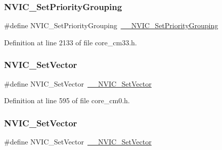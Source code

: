 \subsubsection{\texorpdfstring{N\+V\+I\+C\+\_\+\+Set\+Priority\+Grouping}{NVIC\_SetPriorityGrouping}\hspace{0.1cm}{\footnotesize\ttfamily [11/11]}}
{\footnotesize\ttfamily \#define N\+V\+I\+C\+\_\+\+Set\+Priority\+Grouping~\hyperlink{group___c_m_s_i_s___core___n_v_i_c_functions_gafc94dcbaee03e4746ade1f5bb9aaa56d}{\+\_\+\+\_\+\+N\+V\+I\+C\+\_\+\+Set\+Priority\+Grouping}}



Definition at line 2133 of file core\+\_\+cm33.\+h.

\mbox{\label{group___c_m_s_i_s___core___n_v_i_c_functions_ga804af63bb4c4c317387897431814775d}} 
\subsubsection{\texorpdfstring{N\+V\+I\+C\+\_\+\+Set\+Vector}{NVIC\_SetVector}\hspace{0.1cm}{\footnotesize\ttfamily [1/13]}}
{\footnotesize\ttfamily \#define N\+V\+I\+C\+\_\+\+Set\+Vector~\hyperlink{group___c_m_s_i_s___core___n_v_i_c_functions_ga0df355460bc1783d58f9d72ee4884208}{\+\_\+\+\_\+\+N\+V\+I\+C\+\_\+\+Set\+Vector}}



Definition at line 595 of file core\+\_\+cm0.\+h.

\mbox{\label{group___c_m_s_i_s___core___n_v_i_c_functions_ga804af63bb4c4c317387897431814775d}} 
\subsubsection{\texorpdfstring{N\+V\+I\+C\+\_\+\+Set\+Vector}{NVIC\_SetVector}\hspace{0.1cm}{\footnotesize\ttfamily [2/13]}}
{\footnotesize\ttfamily \#define N\+V\+I\+C\+\_\+\+Set\+Vector~\hyperlink{group___c_m_s_i_s___core___n_v_i_c_functions_ga0df355460bc1783d58f9d72ee4884208}{\+\_\+\+\_\+\+N\+V\+I\+C\+\_\+\+Set\+Vector}}



